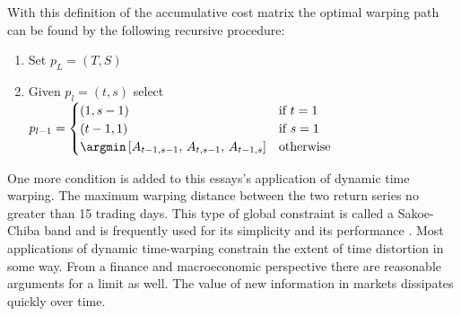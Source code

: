 With this definition of the accumulative cost matrix the optimal warping path can be found by the following recursive procedure:

\begin{enumerate}
    \item Set $p_{L} = (T, S)$
    \item Given $p_{l} = (t, s)$ select $p_{l - 1} = \begin{cases} (1, s-1) & \textrm{if } t=1 \\ (t-1,1) & \textrm{if } s=1 \\ 
                                            \argmin \left[ A_{t-1, s-1},\, A_{t, s-1},\, A_{t-1, s} \right] & \textrm{otherwise} \end{cases}$
\end{enumerate}

One more condition is added to this essays's application of dynamic time warping. The maximum warping distance between the two return series no greater than 15 trading days. This type of global constraint is called a Sakoe-Chiba band \cite{SakoeChiba_IEEE_1978} and is frequently used for its simplicity and its performance \cite{geler2019dynamic}. Most applications of dynamic time-warping constrain the extent of time distortion in some way. From a finance and macroeconomic perspective there are reasonable arguments for a limit as well. The value of new information in markets dissipates quickly over time.

%

